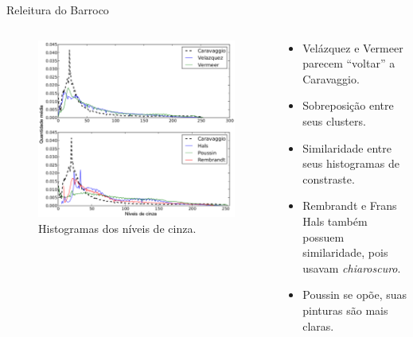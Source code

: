 \documentclass{beamer}
\begin{document}
\begin{frame}{Releitura do Barroco}
\begin{columns}
\begin{column}{.49\textwidth}
{\begin{figure}[h!]
\begin{center}
    \includegraphics[width=1.1\columnwidth]{figs/chiaroscuro2}
    \caption{Histogramas dos níveis de cinza.}
\end{center}
\end{figure}
}
 \end{column}

 \begin{column}{.49\textwidth}
  \begin{itemize}
    \item<1> Velázquez e Vermeer parecem ``voltar'' a Caravaggio.

    \item<2> Sobreposição entre seus clusters.

    \item<3> Similaridade entre seus histogramas de constraste. 

    \item<3> Rembrandt e Frans Hals também possuem similaridade, pois usavam \textit{chiaroscuro}.

    \item<3> Poussin se opõe, suas pinturas são mais claras.
    \end{itemize}
 \end{column}
\end{columns}

\end{frame}

\end{document}
